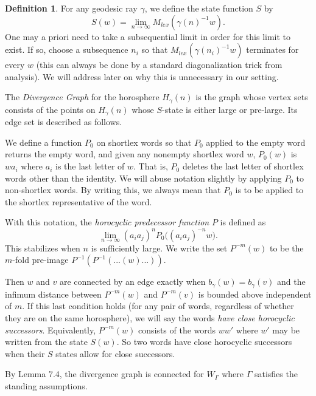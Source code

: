 \documentclass[10pt,a4paper]{amsart}
\theoremstyle{definition}
\newtheorem{definition}[theorem]{Definition}
\theoremstyle{remark}
\begin{document}
	\begin{definition}
		
		For any geodesic ray $\gamma$, we define the state function $S$ by $$S(w)=\lim_{n\to\infty} M_{lex}( \gamma(n)^{-1} w).$$ One may a priori need to take a subsequential limit in order for this limit to exist. If so, choose a subsequence $n_i$ so that $M_{lex}( \gamma(n_i)^{-1} w)$ terminates for every $w$ (this can always be done by a standard diagonalization trick from analysis). We will address later on why this is unnecessary in our setting.
		
		The \textit{Divergence Graph} for the horosphere $H_\gamma(n)$ is the graph whose vertex sets consists of the points on $H_\gamma(n)$ whose $S$-state is either large or pre-large. Its edge set is described as follows.
		
		We define a function $P_0$ on shortlex words so that $P_0$ applied to the empty word returns the empty word, and given any nonempty shortlex word $w$, $P_0(w)$ is $wa_i$ where $a_i$ is the last letter of $w$. That is, $P_0$ deletes the last letter of shortlex words other than the identity. We will abuse notation slightly by applying $P_0$ to non-shortlex words. By writing this, we always mean that $P_0$ is to be applied to the shortlex representative of the word.
		
		With this notation, the \textit{horocyclic predecessor function} $P$ is defined as $$\lim_{n\to\infty} (a_ia_j)^nP_0\bigl( (a_ia_j)^{-n}w\bigr).$$ This stabilizes when $n$ is sufficiently large. We write the set $P^{-m}(w)$ to be the $m$-fold pre-image $P^{-1}(P^{-1}(...(w)...))$. 
		
		Then $w$ and $v$ are connected by an edge exactly when $b_\gamma(w)=b_\gamma(v)$ and the infimum distance between $P^{-m}(w)$ and $P^{-m}(v)$ is bounded above independent of $m$. If this last condition holds (for any pair of words, regardless of whether they are on the same horosphere), we will say the words \textit{have close horocyclic successors}. Equivalently, $P^{-m}(w)$ consists of the words $ww'$ where $w'$ may be written from the state $S(w)$. So two words have close horocyclic successors when their $S$ states allow for close successors.
		
	\end{definition}
	
	By \cite{CGSR} Lemma 7.4, the divergence graph is connected for $W_\Gamma$ where $\Gamma$ satisfies the standing assumptions.
	
\end{document}
